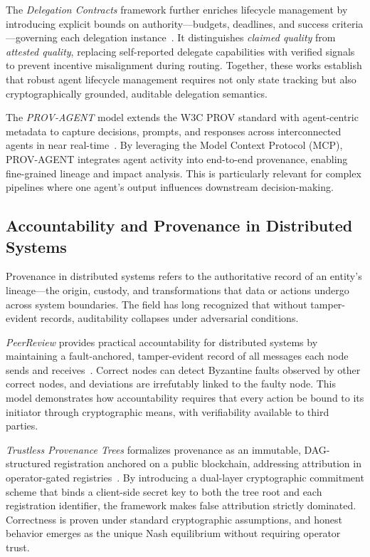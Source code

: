 The \textit{Delegation Contracts} framework further enriches lifecycle management by introducing explicit bounds on authority---budgets, deadlines, and success criteria---governing each delegation instance~\cite{arXiv2603.18043}. It distinguishes \textit{claimed quality} from \textit{attested quality}, replacing self-reported delegate capabilities with verified signals to prevent incentive misalignment during routing. Together, these works establish that robust agent lifecycle management requires not only state tracking but also cryptographically grounded, auditable delegation semantics.

The \textit{PROV-AGENT} model extends the W3C PROV standard with agent-centric metadata to capture decisions, prompts, and responses across interconnected agents in near real-time~\cite{arXiv2508.02866}. By leveraging the Model Context Protocol (MCP), PROV-AGENT integrates agent activity into end-to-end provenance, enabling fine-grained lineage and impact analysis. This is particularly relevant for complex pipelines where one agent's output influences downstream decision-making.

\subsection{Accountability and Provenance in Distributed Systems}
\label{sec:accountability-provenance}

Provenance in distributed systems refers to the authoritative record of an entity's lineage---the origin, custody, and transformations that data or actions undergo across system boundaries. The field has long recognized that without tamper-evident records, auditability collapses under adversarial conditions.

\textit{PeerReview} provides practical accountability for distributed systems by maintaining a fault-anchored, tamper-evident record of all messages each node sends and receives~\cite{peerreview07}. Correct nodes can detect Byzantine faults observed by other correct nodes, and deviations are irrefutably linked to the faulty node. This model demonstrates how accountability requires that every action be bound to its initiator through cryptographic means, with verifiability available to third parties.

\textit{Trustless Provenance Trees} formalizes provenance as an immutable, DAG-structured registration anchored on a public blockchain, addressing attribution in operator-gated registries~\cite{arXiv2604.03434}. By introducing a dual-layer cryptographic commitment scheme that binds a client-side secret key to both the tree root and each registration identifier, the framework makes false attribution strictly dominated. Correctness is proven under standard cryptographic assumptions, and honest behavior emerges as the unique Nash equilibrium without requiring operator trust.

